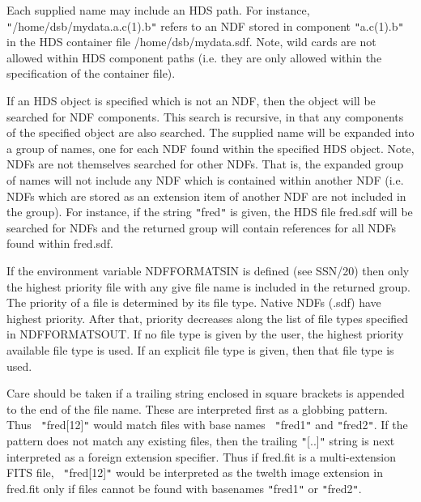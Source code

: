 \documentclass[twoside,11pt]{article}
\newcommand{\xref}[3]{#1}
\renewcommand{\_}{\texttt{\symbol{95}}}
\newcommand{\sstitem}{\item}
\newcommand{\sstitem}{\item}
\begin{document}
{{{         \sstitem
         Each supplied name may include an HDS path. For instance,
         {\tt "}/home/dsb/mydata.a.c(1).b{\tt "} refers to an NDF stored in component
         {\tt "}a.c(1).b{\tt "} in the HDS container file /home/dsb/mydata.sdf. Note,
         wild cards are not allowed within HDS component paths (i.e. they
         are only allowed within the specification of the container file).

         \sstitem
         If an HDS object is specified which is not an NDF, then the
         object will be searched for NDF components. This search is
         recursive, in that any components of the specified object are also
         searched. The supplied name will be expanded into a group of names,
         one for each NDF found within the specified HDS object. Note, NDFs
         are not themselves searched for other NDFs. That is, the expanded
         group of names will not include any NDF which is contained within
         another NDF (i.e. NDFs which are stored as an extension item of
         another NDF are not included in the group). For instance, if the
         string {\tt "}fred{\tt "} is given, the HDS file fred.sdf will be searched for
         NDFs and the returned group will contain references for all NDFs
         found within fred.sdf.

         \sstitem
         If the environment variable NDF\_FORMATS\_IN is defined (see
         \xref{SSN/20}{ssn20}{}) then only the highest priority file with any give file name
         is included in the returned group. The priority of a file is
         determined by its file type. Native NDFs (.sdf) have highest
         priority. After that, priority decreases along the list of file
         types specified in NDF\_FORMATS\_OUT. If no file type is given by
         the user, the highest priority available file type is used. If an
         explicit file type is given, then that file type is used.

         \sstitem

         Care should be taken if a trailing string enclosed in square
	 brackets is appended to the end of the file name. These are
	 interpreted first as a globbing pattern. Thus {\tt
	 "}fred[12]{\tt "} would match files with base names {\tt
	 "}fred1{\tt "} and {\tt "}fred2{\tt "}. If the pattern does not
	 match any existing files, then the trailing {\tt "}[..]{\tt "}
	 string is next interpreted as a foreign extension specifier.
	 Thus if fred.fit is a multi-extension FITS file, {\tt
	 "}fred[12]{\tt "} would be interpreted as the twelth image
	 extension in fred.fit only if files cannot be found with
	 basenames {\tt "}fred1{\tt "} or {\tt "}fred2{\tt "}.

}}}
\end{document}
